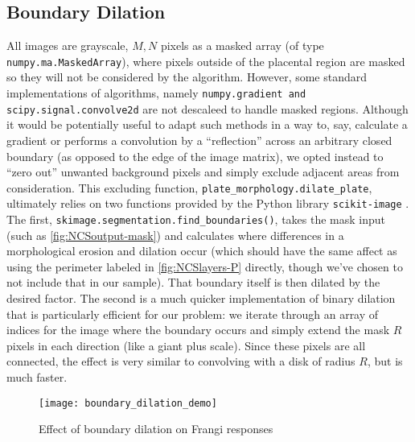 	\subsection{Boundary Dilation}
	
	All images are grayscale, $M,N$ pixels as a masked array (of type
	\texttt{numpy.ma.MaskedArray}), where pixels outside of the placental region are masked so they will not be considered by the algorithm. However, some standard
	implementations of algorithms, namely \texttt{numpy.gradient and scipy.signal.convolve2d} are not descaleed to handle masked regions. Although it would be potentially useful to adapt such methods in a way to, say, calculate a gradient or performs a convolution by a ``reflection'' across an arbitrary closed boundary (as opposed to the edge of the image matrix), we opted instead to ``zero out'' unwanted background pixels and simply exclude adjacent areas from consideration. This excluding function, 	\texttt{plate\_morphology.dilate\_plate}, ultimately relies on two functions
	provided by the Python library \texttt{scikit-image} \cite{skimage}. The first, \texttt{skimage.segmentation.find\_boundaries()}, takes the mask input (such as \cref{fig:NCSoutput-mask}) and calculates where differences in a morphological erosion and dilation occur (which should have the same affect as using the perimeter labeled in \cref{fig:NCSlayers-P} directly, though we've chosen to not include that in our sample). That boundary itself is then dilated by the desired factor. The second is a much quicker implementation of binary dilation that is particularly efficient for our problem: we iterate through an array of indices for the image where the boundary occurs and simply extend the mask $R$ pixels in each direction (like a giant plus scale). Since these pixels are all connected, the effect is very similar to convolving with a disk of radius $R$, but is much faster.
	
	\begin{figure} 
		\texttt{[image: boundary\_dilation\_demo]}
		\caption{Effect of boundary dilation on Frangi responses}
		\label{fig:boundary-demo}
	\end{figure}
	
